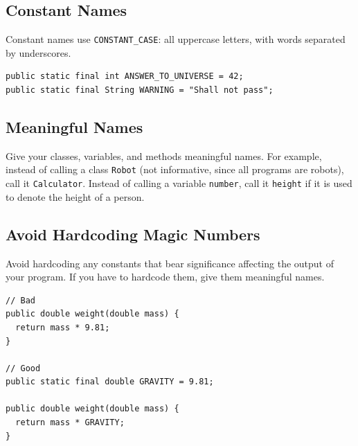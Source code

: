 \documentclass[10pt,DIV=23,landscape]{scrartcl}
\begin{document}
\subsection{Constant Names}\label{constant-names}

\begin{paracol}{2}
\begin{leftcolumn}
Constant names use \lstinline{CONSTANT_CASE}: all uppercase letters, with
words separated by underscores.
\end{leftcolumn}

\begin{rightcolumn}
\begin{lstlisting}
public static final int ANSWER_TO_UNIVERSE = 42;
public static final String WARNING = "Shall not pass";
\end{lstlisting}
\end{rightcolumn}
\end{paracol}

\subsection{Meaningful Names}\label{meaningful-names}

Give your classes, variables, and methods meaningful names. For example,
instead of calling a class \lstinline{Robot} (not informative, since all
programs are robots), call it \lstinline{Calculator}. Instead of calling a
variable \lstinline{number}, call it \lstinline{height} if it is used to
denote the height of a person.

\subsection{Avoid Hardcoding Magic
Numbers}\label{avoid-hardcoding-magic-numbers}

\begin{paracol}{2}
\begin{leftcolumn}
Avoid hardcoding any constants that bear significance affecting the
output of your program. If you have to hardcode them, give them
meaningful names.
\end{leftcolumn}

\begin{rightcolumn}
\begin{lstlisting}
// Bad
public double weight(double mass) {
  return mass * 9.81;
}

// Good
public static final double GRAVITY = 9.81;

public double weight(double mass) {
  return mass * GRAVITY;
}
\end{lstlisting}
\end{rightcolumn}
\end{paracol}
\end{document}
